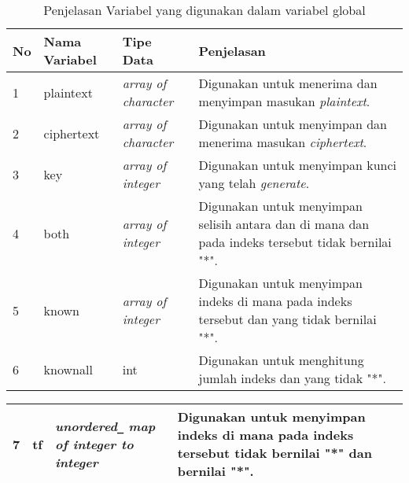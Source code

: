 \begin{minipage}{\linewidth}

\end{minipage} 

\begin{table}[H]
	 	\caption{Penjelasan Variabel yang digunakan dalam variabel global}
		\begin{tabular}   {|p{0.5cm}|p{2.5cm}|p{2cm}|p{4cm}|}\hline
		No&Nama Variabel&Tipe Data&Penjelasan \\ \hline
		1&plaintext&\textit{array of character}&Digunakan untuk menerima dan  menyimpan masukan \textit{plaintext}. \\ \hline
		2&ciphertext&\textit{array of character}&Digunakan untuk menyimpan dan menerima masukan \textit{ciphertext}. \\ \hline
		3&key&\textit{array of integer}&Digunakan untuk menyimpan kunci yang telah \textit{generate}. \\ \hline
		4&both&\textit{array of integer}&Digunakan untuk menyimpan selisih antara \plaintext dan \ciphertext di mana \plaintext dan \ciphertext pada indeks tersebut tidak bernilai "*". \\ \hline
		5&known&\textit{array of integer} &Digunakan untuk menyimpan indeks di mana pada indeks tersebut \plaintext dan \ciphertext yang tidak bernilai "*". \\ \hline
		6&knownall&int&Digunakan untuk menghitung jumlah indeks \plaintext dan \ciphertext yang tidak "*". \\ \hline
		\end{tabular}%
		\label{tab:mainvar}
	\end{table}
	
	\begin{table}[H]
		\begin{tabular}   {|p{0.5cm}|p{2.5cm}|p{2cm}|p{4cm}|}\hline
		7&tf&\textit{unordered}\verb|_| \textit{map} \textit{of integer to integer}&Digunakan untuk menyimpan indeks di mana pada indeks tersebut \ciphertext tidak bernilai "*" dan \plaintext bernilai "*". \\ \hline
		\end{tabular}%
		\label{tab:mainvar}
	\end{table}	
	
